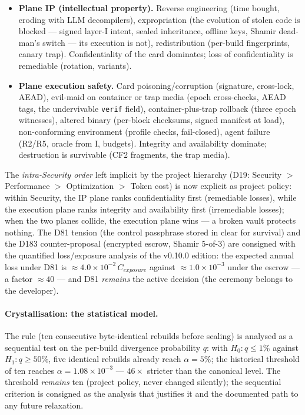 \documentclass[11pt,a4paper]{article}
\newcommand{\code}[1]{\texttt{\small #1}}
\begin{document}
\begin{itemize}
\item \textbf{Plane IP (intellectual property).} Reverse engineering
(time bought, eroding with LLM decompilers), expropriation (the
evolution of stolen code is blocked --- signed layer-I intent, sealed
inheritance, offline keys, Shamir dead-man's switch --- its execution
is not), redistribution (per-build fingerprints, canary trap).
Confidentiality of the card dominates; loss of confidentiality is
remediable (rotation, variants).
\item \textbf{Plane execution safety.} Card poisoning/corruption
(signature, cross-lock, AEAD), evil-maid on container or trap media
(epoch cross-checks, AEAD tags, the undervivable \code{verif} field),
container-plus-trap rollback (three epoch witnesses), altered binary
(per-block checksums, signed manifest at load), non-conforming
environment (profile checks, fail-closed), agent failure (R2/R5,
oracle from I, budgets). Integrity and availability dominate;
destruction is survivable (CF2 fragments, the trap media).
\end{itemize}

The \emph{intra-Security order} left implicit by the project hierarchy
(D19: Security $>$ Performance $>$ Optimization $>$ Token cost) is now
explicit as project policy: within Security, the IP plane ranks
confidentiality first (remediable losses), while the execution plane
ranks integrity and availability first (irremediable losses); when the
two planes collide, the execution plane wins --- a broken vault protects
nothing. The D81 tension (the control passphrase stored in clear for
survival) and the D183 counter-proposal (encrypted escrow, Shamir
5-of-3) are consigned with the quantified loss/exposure analysis of the
v0.10.0 edition: the expected annual loss under D81 is
$\approx 4.0 \times 10^{-2}\,C_{exposure}$ against
$\approx 1.0 \times 10^{-3}$ under the escrow --- a factor $\approx 40$
--- and D81 \emph{remains} the active decision (the ceremony belongs to
the developer).

\paragraph{Crystallisation: the statistical model.} The rule (ten
consecutive byte-identical rebuilds before sealing) is analysed as a
sequential test on the per-build divergence probability $q$: with
$H_0: q \le 1\%$ against $H_1: q \ge 50\%$, five identical rebuilds
already reach $\alpha = 5\%$; the historical threshold of ten reaches
$\alpha = 1.08 \times 10^{-3}$ --- $46\times$ stricter than the
canonical level. The threshold \emph{remains} ten (project policy,
never changed silently); the sequential criterion is consigned as the
analysis that justifies it and the documented path to any future
relaxation.
\end{document}

